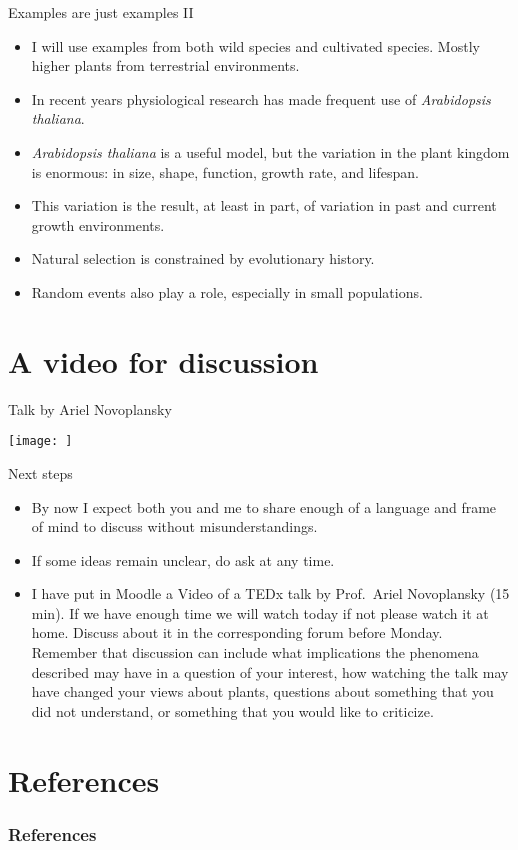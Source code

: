 \documentclass[10pt]{beamer}
\begin{document}
\begin{frame}{Examples are just examples II}

\begin{itemize}
  \item I will use examples from both wild species and cultivated species. Mostly higher plants from terrestrial environments.
  \item In recent years physiological research has made frequent use of \emph{Arabidopsis thaliana}.
  \item \emph{Arabidopsis thaliana} is a useful model, but the variation in the plant kingdom is enormous: in size, shape, function, growth rate, and lifespan.
  \item This variation is the result, at least in part, of variation in past and current growth environments.
  \item Natural selection is constrained by evolutionary history.
  \item Random events also play a role, especially in small populations.
\end{itemize}

\end{frame}

\section{A video for discussion}

\begin{frame}{Talk by Ariel Novoplansky \Video}
  
  \texttt{[image: ]}
  
\end{frame}


\begin{frame}{Next steps \Discussion}
\begin{itemize}
  \item By now I expect both you and me to share enough of a language and frame of mind to discuss without misunderstandings.
  \item If some ideas remain unclear, do ask at any time.
  \item I have put in Moodle a Video of a TEDx talk by Prof.\ Ariel Novoplansky (15 min). If we have enough time we will watch today if not please watch it at home. Discuss about it in the corresponding forum before Monday. Remember that discussion can include what implications the phenomena described may have in a question of your interest, how watching the talk may have changed your views about plants, questions about something that you did not understand, or something that you would like to criticize.
\end{itemize}

\end{frame}

  \section*{References}
  \nocite{Ballare2009}
  \begin{frame}[t,allowframebreaks]
    \frametitle{References}
    \printbibliography
  \end{frame}
\end{document}
